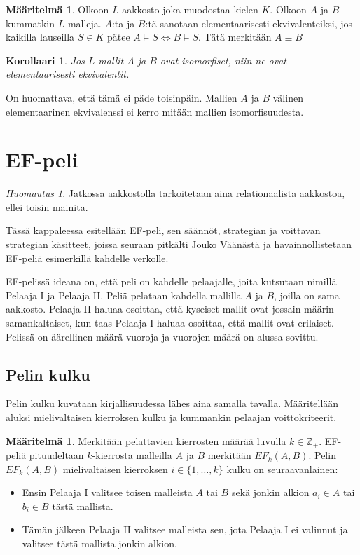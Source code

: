\documentclass[finnish]{tktltiki2}
\newtheorem{kor}[lau]{Korollaari}
\theoremstyle{definition}
\newtheorem{maar}[lau]{Määritelmä}
\theoremstyle{remark}
\newtheorem*{huom}{Huomautus}
\begin{document}
\begin{maar}
Olkoon $L$ aakkosto joka muodostaa kielen $K$. Olkoon $A$ ja $B$ kummatkin $L$-malleja. $A$:ta ja $B$:tä sanotaan elementaarisesti ekvivalenteiksi, jos kaikilla lauseilla $S \in K$ pätee $A \vDash S \Longleftrightarrow B \vDash S$. Tätä merkitään $A \equiv B$
\end{maar}

\begin{kor}
Jos $L$-mallit $A$ ja $B$ ovat isomorfiset, niin ne ovat elementaarisesti ekvivalentit.
\end{kor}

On huomattava, että tämä ei päde toisinpäin. Mallien $A$ ja $B$ välinen elementaarinen ekvivalenssi ei kerro mitään mallien isomorfisuudesta. 

\section{EF-peli}
\begin{huom}
Jatkossa aakkostolla tarkoitetaan aina relationaalista aakkostoa, ellei toisin mainita.
\end{huom}

Tässä kappaleessa esitellään EF-peli, sen säännöt, strategian ja voittavan strategian käsitteet, joissa seuraan pitkälti Jouko Väänästä \cite{Vaa11} ja havainnollistetaan EF-peliä esimerkillä kahdelle verkolle.

EF-pelissä ideana on, että peli on kahdelle pelaajalle, joita kutsutaan nimillä Pelaaja I ja Pelaaja II. Peliä pelataan kahdella mallilla $A$ ja $B$, joilla on sama aakkosto. Pelaaja II haluaa osoittaa, että kyseiset mallit ovat jossain määrin samankaltaiset, kun taas Pelaaja I haluaa osoittaa, että mallit ovat erilaiset. Pelissä on äärellinen määrä vuoroja ja vuorojen määrä on alussa sovittu.

\subsection{Pelin kulku}
Pelin kulku kuvataan kirjallisuudessa lähes aina samalla tavalla. Määritellään aluksi mielivaltaisen kierroksen kulku ja kummankin pelaajan voittokriteerit.

\begin{maar}
Merkitään pelattavien kierrosten määrää luvulla $k \in \mathbb{Z}_+$. EF-peliä pituudeltaan $k$-kierrosta malleilla $A$ ja $B$ merkitään $EF_k(A, B)$. Pelin $EF_k(A, B)$ mielivaltaisen kierroksen $i \in \{1, \ldots, k\}$ kulku on seuraavanlainen: 
\begin{itemize}
\item Ensin Pelaaja I valitsee toisen malleista $A$ tai $B$ sekä jonkin alkion $a_i \in A$ tai $b_i \in B$ tästä mallista.
\item Tämän jälkeen Pelaaja II valitsee malleista sen, jota Pelaaja I ei valinnut ja valitsee tästä mallista jonkin alkion.
\end{itemize}
\end{maar}
\end{document}
